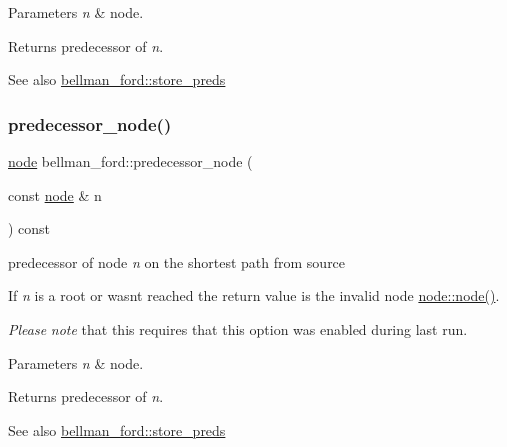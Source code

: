 \begin{DoxyParams}{Parameters}
{\em n} & node. \\
\hline
\end{DoxyParams}
\begin{DoxyReturn}{Returns}
predecessor of {\itshape n}. 
\end{DoxyReturn}
\begin{DoxySeeAlso}{See also}
\mbox{\hyperlink{classbellman__ford_ab45cad1c97e011053efe6382f99b6cda}{bellman\+\_\+ford\+::store\+\_\+preds}} 
\end{DoxySeeAlso}
\mbox{\label{classbellman__ford_a403e286ec8cbe3c30a7a729c5041155e}} 
\subsubsection{\texorpdfstring{predecessor\+\_\+node()}{predecessor\_node()}}
{\footnotesize\ttfamily \mbox{\hyperlink{classnode}{node}} bellman\+\_\+ford\+::predecessor\+\_\+node (\begin{DoxyParamCaption}\item[{const \mbox{\hyperlink{classnode}{node}} \&}]{n }\end{DoxyParamCaption}) const\hspace{0.3cm}{\ttfamily [inline]}}



predecessor of node {\itshape n} on the shortest path from source 

If {\itshape n} is a root or wasn\textquotesingle{}t reached the return value is the invalid node \mbox{\hyperlink{classnode_ad603259398d5667e3b97a6322a2bcc20}{node\+::node()}}.

{\itshape Please} {\itshape note} that this requires that this option was enabled during last run.


\begin{DoxyParams}{Parameters}
{\em n} & node. \\
\hline
\end{DoxyParams}
\begin{DoxyReturn}{Returns}
predecessor of {\itshape n}. 
\end{DoxyReturn}
\begin{DoxySeeAlso}{See also}
\mbox{\hyperlink{classbellman__ford_ab45cad1c97e011053efe6382f99b6cda}{bellman\+\_\+ford\+::store\+\_\+preds}} 
\end{DoxySeeAlso}
\mbox{\label{classbellman__ford_adb6717e842fbdc6501879eb798cc2030}} 
